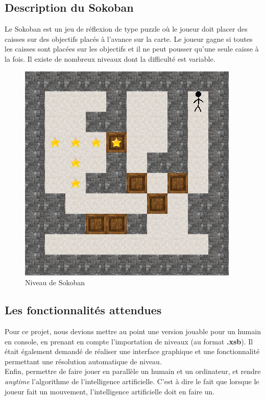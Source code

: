 \documentclass[a4paper,12pt]{article} %
\begin{document}
\subsection*{Description du Sokoban}

Le Sokoban est un jeu de réflexion de type puzzle où le joueur doit placer des caisses sur des objectifs placés à l'avance sur la carte. Le joueur gagne si toutes les caisses sont placées sur les objectifs et il ne peut pousser qu'une seule caisse à la fois. Il existe de nombreux niveaux dont la difficulté est variable.

\begin{figure}[!h]
\centering
\includegraphics[scale=0.5]{images/sokoban.png}
\caption{Niveau de Sokoban}
\end{figure}

\subsection*{Les fonctionnalités attendues}

Pour ce projet, nous devions mettre au point une version jouable pour un humain en console, en prenant en compte l'importation de niveaux (au format \textbf{.xsb}). Il était également demandé de réaliser une interface graphique et une fonctionnalité permettant une résolution automatique de niveau.\\
Enfin, permettre de faire jouer en parallèle un humain et un ordinateur, et rendre \textit{anytime} l'algorithme de l'intelligence artificielle. C'est à dire le fait que lorsque le joueur fait un mouvement, l'intelligence artificielle doit en faire un.
\end{document}
